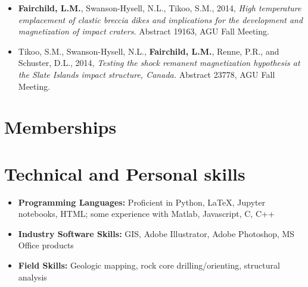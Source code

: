 \documentclass[11pt,a4paper,sans]{moderncv}        %
\begin{document}
\begin{itemize}
\item{\textbf{Fairchild, L.M.}, Swanson-Hysell, N.L., Tikoo, S.M., 2014, \textit{High temperature emplacement of clastic breccia dikes and implications for the development and magnetization of impact craters.} Abstract 19163, AGU Fall Meeting.}

\vspace{3pt}

\item{Tikoo, S.M., Swanson-Hysell, N.L., \textbf{Fairchild, L.M.}, Renne, P.R., and Schuster, D.L., 2014, \textit{Testing the shock remanent magnetization hypothesis at the Slate Islands impact structure, Canada.} Abstract 23778, AGU Fall Meeting.}

\end{itemize}

\section{Memberships}






\section{Technical and Personal skills}

\vspace{6pt}

\begin{itemize}

%

\item \textbf{Programming Languages:} Proficient in Python, LaTeX, Jupyter notebooks, HTML; some experience with 
    Matlab, Javascript, C, C{++}

\vspace{6pt}

\item \textbf{Industry Software Skills:} GIS, Adobe Illustrator, Adobe Photoshop, MS Office products

\vspace{6pt}

\item \textbf{Field Skills:} Geologic mapping, rock core drilling/orienting, structural analysis

\end{itemize}
\end{document}
